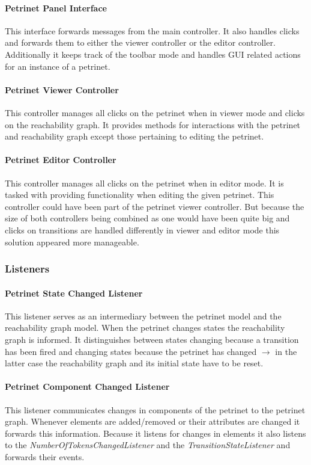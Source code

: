 \documentclass[10pt, a4paper]{article}
\begin{document}
\paragraph{Petrinet Panel Interface} This interface forwards messages from the main controller. It also handles clicks and forwards them to either the viewer controller or the editor controller. Additionally it keeps track of the toolbar mode and handles GUI related actions for an instance of a petrinet. 
\paragraph{Petrinet Viewer Controller} This controller manages all clicks on the petrinet when in viewer mode and clicks on the reachability graph. It provides methods for interactions with the petrinet and reachability graph except those pertaining to editing the petrinet.  
\paragraph{Petrinet Editor Controller} This controller manages all clicks on the petrinet when in editor mode. It is tasked with providing functionality when editing the given petrinet. This controller could have been part of the petrinet viewer controller. But because the size of both controllers being combined as one would have been quite big and clicks on transitions are handled differently in viewer and editor mode this solution appeared more manageable.

\subsubsection{Listeners}

\paragraph{Petrinet State Changed Listener} This listener serves as an intermediary between the petrinet model and the reachability graph model. When the petrinet changes states the reachability graph is informed. It distinguishes between states changing because a transition has been fired and changing states because the petrinet has changed $\rightarrow$ in the latter case the reachability graph and its initial state have to be reset.
\paragraph{Petrinet Component Changed Listener} This listener communicates changes in components of the petrinet to the petrinet graph. Whenever elements are added/removed or their attributes are changed it forwards this information.  Because it listens for changes in elements it also listens to the \textit{NumberOfTokensChangedListener} and the \textit{TransitionStateListener} and forwards their events.
\end{document}
